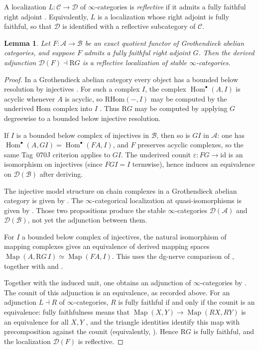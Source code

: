 \documentclass[11pt]{amsart}
\newcommand{\cA}{\mathcal{A}}
\newcommand{\cB}{\mathcal{B}}
\newcommand{\cC}{\mathcal{C}}
\newcommand{\cD}{\mathcal{D}}
\newcommand{\Hom}{\operatorname{Hom}}
\newcommand{\Map}{\operatorname{Map}}
\theoremstyle{plain}
\newtheorem{lemma}[lemma]{Lemma}
\theoremstyle{definition}
\numberwithin{equation}{section}
\begin{document}
A localization $L:\cC\to\cD$ of $\infty$-categories is \textit{reflective} if it admits a fully faithful right adjoint \cite[Definition 5.2.7.2]{HTT}.
Equivalently, $L$ is a localization whose right adjoint is fully faithful, so that $\cD$ is identified with a reflective subcategory of $\cC$.

\begin{lemma}\label{lem:reflective-quotient}
Let $F:\cA\to\cB$ be an exact quotient functor of Grothendieck abelian categories, and suppose $F$ admits a fully faithful right adjoint $G$.
Then the derived adjunction $\cD(F)\dashv\mathrm RG$ is a reflective localization of stable $\infty$-categories.
\end{lemma}
\begin{proof}
In a Grothendieck abelian category every object has a bounded below resolution by injectives \cite[Corollary 1.3.5.7]{HA}.
For such a complex $I$, the complex $\Hom^\bullet(A,I)$ is acyclic whenever $A$ is acyclic, so $\mathrm{RHom}(-,I)$ may be computed by the underived Hom complex into $I$ \cite[\href{https://stacks.math.columbia.edu/tag/070J}{Tag 070J}]{SP}.
Thus $\mathrm RG$ may be computed by applying $G$ degreewise to a bounded below injective resolution.

If $I$ is a bounded below complex of injectives in $\cB$, then so is $GI$ in $\cA$: one has $\Hom^\bullet(A,GI)=\Hom^\bullet(FA,I)$, and $F$ preserves acyclic complexes, so the same Tag~070J criterion applies to $GI$.
The underived counit $\varepsilon:FG\to\mathrm{id}$ is an isomorphism on injectives (since $FGI=I$ termwise), hence induces an equivalence on $\cD(\cB)$ after deriving.

The injective model structure on chain complexes in a Grothendieck abelian category is given by \cite[Proposition 1.3.5.3]{HA}.
The $\infty$-categorical localization at quasi-isomorphisms is given by \cite[Proposition 1.3.5.15]{HA}.
Those two propositions produce the stable $\infty$-categories $\cD(\cA)$ and $\cD(\cB)$, not yet the adjunction between them.

For $I$ a bounded below complex of injectives, the natural isomorphism of mapping complexes gives an equivalence of derived mapping spaces $\Map(A,\mathrm RG\,I)\simeq\Map(FA,I)$.
This uses the dg-nerve comparison of \cite[Remark 1.3.1.12]{HA}, together with \cite[Proposition 1.3.1.17]{HA} and \cite[Proposition 1.3.5.13]{HA}.

Together with the induced unit, one obtains an adjunction of $\infty$-categories by \cite[Proposition 5.2.2.8]{HTT}.
The counit of this adjunction is an equivalence, as recorded above.
For an adjunction $L\dashv R$ of $\infty$-categories, $R$ is fully faithful if and only if the counit is an equivalence: fully faithfulness means that $\Map(X,Y)\to\Map(RX,RY)$ is an equivalence for all $X,Y$ \cite[Definition 1.2.10.1]{HTT}, and the triangle identities identify this map with precomposition against the counit (equivalently, \cite[\href{https://kerodon.net/tag/02FF}{Tag 02FF}]{Kerodon}).
Hence $\mathrm RG$ is fully faithful, and the localization $\cD(F)$ is reflective.
\end{proof}
\end{document}

